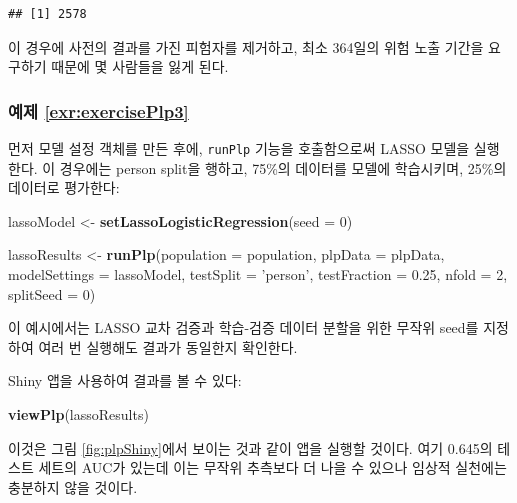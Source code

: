 \documentclass[11pt]{book}
\newenvironment{Shaded}{\begin{snugshade}}{\end{snugshade}}
\newcommand{\KeywordTok}[1]{\textcolor[rgb]{0.13,0.29,0.53}{\textbf{#1}}}
\newcommand{\DataTypeTok}[1]{\textcolor[rgb]{0.13,0.29,0.53}{#1}}
\newcommand{\DecValTok}[1]{\textcolor[rgb]{0.00,0.00,0.81}{#1}}
\newcommand{\FloatTok}[1]{\textcolor[rgb]{0.00,0.00,0.81}{#1}}
\newcommand{\StringTok}[1]{\textcolor[rgb]{0.31,0.60,0.02}{#1}}
\newcommand{\NormalTok}[1]{#1}
\theoremstyle{definition}
\theoremstyle{definition}
\theoremstyle{definition}
\theoremstyle{remark}
\begin{document}
\begin{verbatim}
## [1] 2578
\end{verbatim}

이 경우에 사전의 결과를 가진 피험자를 제거하고, 최소 364일의 위험 노출
기간을 요구하기 때문에 몇 사람들을 잃게 된다.

\subsubsection*{예제 \ref{exr:exercisePlp3}}\label{-refexrexerciseplp3}

먼저 모델 설정 객체를 만든 후에, \texttt{runPlp} 기능을 호출함으로써
LASSO 모델을 실행한다. 이 경우에는 person split을 행하고, 75\%의
데이터를 모델에 학습시키며, 25\%의 데이터로 평가한다:

\begin{Shaded}
\begin{Highlighting}[]
\NormalTok{lassoModel <-}\StringTok{ }\KeywordTok{setLassoLogisticRegression}\NormalTok{(}\DataTypeTok{seed =} \DecValTok{0}\NormalTok{)}

\NormalTok{lassoResults <-}\StringTok{ }\KeywordTok{runPlp}\NormalTok{(}\DataTypeTok{population =}\NormalTok{ population, }
                       \DataTypeTok{plpData =}\NormalTok{ plpData, }
                       \DataTypeTok{modelSettings =}\NormalTok{ lassoModel, }
                       \DataTypeTok{testSplit =} \StringTok{'person'}\NormalTok{,}
                       \DataTypeTok{testFraction =} \FloatTok{0.25}\NormalTok{, }
                       \DataTypeTok{nfold =} \DecValTok{2}\NormalTok{, }
                       \DataTypeTok{splitSeed =} \DecValTok{0}\NormalTok{)}
\end{Highlighting}
\end{Shaded}

이 예시에서는 LASSO 교차 검증과 학습-검증 데이터 분할을 위한 무작위
seed를 지정하여 여러 번 실행해도 결과가 동일한지 확인한다.

Shiny 앱을 사용하여 결과를 볼 수 있다:

\begin{Shaded}
\begin{Highlighting}[]
\KeywordTok{viewPlp}\NormalTok{(lassoResults)}
\end{Highlighting}
\end{Shaded}

이것은 그림 \ref{fig:plpShiny}에서 보이는 것과 같이 앱을 실행할 것이다.
여기 0.645의 테스트 세트의 AUC가 있는데 이는 무작위 추측보다 더 나을 수
있으나 임상적 실천에는 충분하지 않을 것이다.
\end{document}
